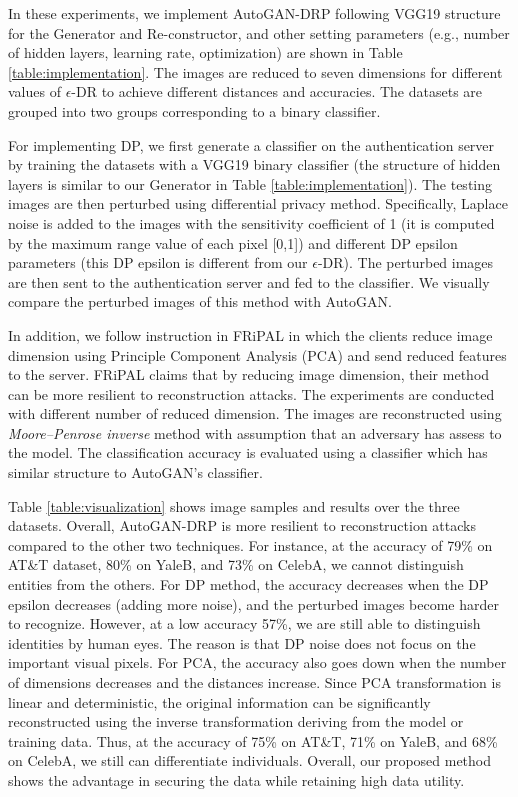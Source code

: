 In these experiments, we implement AutoGAN-DRP following VGG19 structure for the Generator and Re-constructor, and other setting parameters (e.g., number of hidden layers, learning rate, optimization) are shown in Table \ref{table:implementation}. The images are reduced to seven dimensions for different values of $\epsilon$-DR to achieve different distances and accuracies. The datasets are grouped into two groups corresponding to a binary classifier. 

For implementing DP, we first generate a classifier on the authentication server by training the datasets with a VGG19 binary classifier (the structure of hidden layers is similar to our Generator in Table \ref{table:implementation}). The testing images are then perturbed using differential privacy method. Specifically, Laplace noise is added to the images with the sensitivity coefficient of 1 (it is computed by the maximum range value of each pixel [0,1]) and different DP epsilon parameters (this DP epsilon is different from our $\epsilon$-DR). The perturbed images are then sent to the authentication server and fed to the classifier. We visually compare the perturbed images of this method with AutoGAN. 

In addition, we follow instruction in FRiPAL \cite{zhuang2017fripal} in which the clients reduce image dimension using Principle Component Analysis (PCA) and send reduced features to the server. FRiPAL claims that by reducing image dimension, their method can be more resilient to reconstruction attacks. The experiments are conducted with different number of reduced dimension. The images are reconstructed using \textit{Moore–Penrose inverse} method with assumption that an adversary has assess to the model. The classification accuracy is evaluated using a classifier which has similar structure to AutoGAN's classifier. 

Table \ref{table:visualization} shows image samples and results over the three datasets. Overall, AutoGAN-DRP is more resilient to reconstruction attacks compared to the other two techniques. For instance, at the accuracy of 79\% on AT\&T dataset, 80\% on YaleB, and 73\% on CelebA, we cannot distinguish entities from the others. For DP method, the accuracy decreases when the DP epsilon decreases (adding more noise), and the perturbed images become harder to recognize. However, at a low accuracy 57\%, we are still able to distinguish identities by human eyes. The reason is that DP noise does not focus on the important visual pixels. For PCA, the accuracy also goes down when the number of dimensions decreases and the distances increase. Since PCA transformation is linear and deterministic, the original information can be significantly reconstructed using the inverse transformation deriving from the model or training data. Thus, at the accuracy of 75\% on AT\&T, 71\% on YaleB, and 68\% on CelebA, we still can differentiate individuals. Overall, our proposed method shows the advantage in securing the data while retaining high data utility.       


